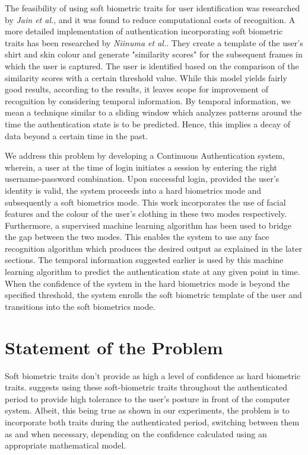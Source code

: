 \documentclass[12pt]{report}			%
\begin{document}
The feasibility of using soft biometric traits for user identification was researched by \emph{Jain et al.}\cite{Jain204}, and it was found to reduce computational costs of recognition.
A more detailed implementation of authentication incorporating soft biometric traits has been researched by \emph{Niinuma et al.}\cite{Niin10}.
They create a template of the user's shirt and skin colour and generate "similarity scores" for the subsequent frames in which the user is captured.
The user is identified based on the comparison of the similarity scores with a certain threshold value.
While this model yields fairly good results, according to the results, it leaves scope for improvement of recognition by considering temporal information.
By temporal information, we mean a technique similar to a sliding window which analyzes patterns around the time the authentication state is to be predicted.
Hence, this implies a decay of data beyond a certain time in the past.

We address this problem by developing a Continuous Authentication system, wherein, a user at the time of login initiates a session by entering the right username-password combination.
Upon successful login, provided the user's identity is valid, the system proceeds into a hard biometrics mode and subsequently a soft biometrics mode.
This work incorporates the use of facial features and the colour of the user's clothing in these two modes respectively. 
Furthermore, a supervised machine learning algorithm has been used to bridge the gap between the two modes.
This enables the system to use any face recognition algorithm which produces the desired output as explained in the later sections.
The temporal information suggested earlier is used by this machine learning algorithm to predict the authentication state at any given point in time.
When the confidence of the system in the hard biometrics mode is beyond the specified threshold, the system enrolls the soft biometric template of the user and transitions into the soft biometrics mode.

\section{ Statement of the Problem }

Soft biometric traits don't provide as high a level of confidence as hard biometric traits. \cite{Niin10} suggests using these soft-biometric traits throughout the authenticated period to provide high tolerance to the user's posture in front of the computer system. Albeit, this being true as shown in our experiments, the problem is to incorporate both traits during the authenticated period, switching between them as and when necessary, depending on the confidence calculated using an appropriate mathematical model.
\end{document}
